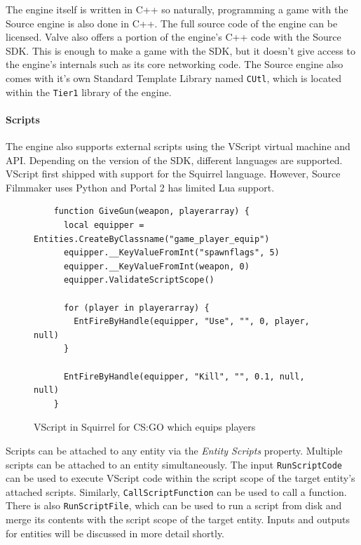 \documentclass[a4paper, 12pt]{scrartcl}
\begin{document}
The engine itself is written in C++ so naturally, programming a game with the Source engine is also done in C++. The full source code of the engine can be licensed. Valve also offers a portion of the engine's C++ code with the Source SDK. This is enough to make a game with the SDK, but it doesn't give access to the engine's internals such as its core networking code. The Source engine also comes with it's own Standard Template Library named \texttt{CUtl}, which is located within the \texttt{Tier1} library of the engine.

\paragraph{Scripts}
The engine also supports external scripts using the VScript virtual machine and API. Depending on the version of the SDK, different languages are supported. VScript first shipped with support for the Squirrel language. However, Source Filmmaker uses Python and Portal 2 has limited Lua support.

\begin{figure}[!htb]
  \begin{verbatim}
    function GiveGun(weapon, playerarray) {
      local equipper = Entities.CreateByClassname("game_player_equip")
      equipper.__KeyValueFromInt("spawnflags", 5)
      equipper.__KeyValueFromInt(weapon, 0)
      equipper.ValidateScriptScope()

      for (player in playerarray) {
        EntFireByHandle(equipper, "Use", "", 0, player, null)
      }

      EntFireByHandle(equipper, "Kill", "", 0.1, null, null)
    }
  \end{verbatim}
  \caption{VScript in Squirrel for CS:GO which equips players}
  \label{fig:source_vscript}
\end{figure}

Scripts can be attached to any entity via the \textit{Entity Scripts} property. Multiple scripts can be attached to an entity simultaneously. The input \texttt{RunScriptCode} can be used to execute VScript code within the script scope of the target entity's attached scripts. Similarly, \texttt{CallScriptFunction} can be used to call a function. There is also \texttt{RunScriptFile}, which can be used to run a script from disk and merge its contents with the script scope of the target entity. Inputs and outputs for entities will be discussed in more detail shortly.
\end{document}
